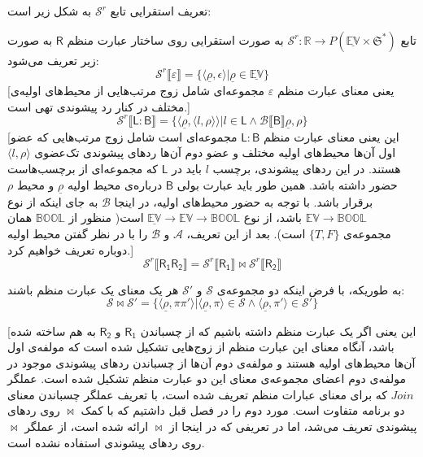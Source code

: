 تعریف استقرایی تابع 
$\mathcal{S}^r$
به شکل زیر است:
\begin{defn}
	تابع 
	$\mathcal{S}^r:\mathbb{R}\rightarrow \mathit{P}(\mathbb{\underline{EV}\times \mathfrak{S}}^*)$
	به صورت استقرایی روی ساختار عبارت منظم $\mathsf{R}$ به صورت زیر تعریف می‌شود:
$$\mathcal{S}^r\llbracket\varepsilon\rrbracket= \{ \langle \underline{\rho} , \epsilon \rangle | \underline{\rho} \in \underline{\mathbb{EV}}\}$$
[یعنی معنای عبارت منظم
$\varepsilon$
مجموعه‌ای شامل زوج مرتب‌هایی از محیط‌های اولیه‌ی مختلف در کنار رد پیشوندی تهی است.]
$$\mathcal{S}^r\llbracket\mathsf{L:B}\rrbracket = \{\langle\underline{\rho},\langle l , \rho \rangle \rangle | l \in \mathsf{L} \land \mathcal{B}\llbracket\mathsf{B}\rrbracket \underline{\rho},\rho \}$$
[این یعنی معنای عبارت منظم
$\mathsf{L:B}$
مجموعه‌ای است شامل زوج مرتب‌هایی که عضو اول آن‌ها محیط‌های اولیه مختلف و عضو دوم آن‌ها ردهای پیشوندی تک‌عضوی 
$\langle l , \rho \rangle$
هستند. در این ردهای پیشوندی، برچسب 
$l$
باید در
$\mathsf{L}$
که مجموعه‌ای از برچسب‌هاست حضور داشته باشد. همین طور باید عبارت بولی 
$\mathsf{B}$
درباره‌ی محیط اولیه
$\underline{\rho}$
و محیط 
$\rho$
برقرار باشد. با توجه به حضور محیط‌های اولیه، در اینجا
$\mathcal{B}$
به جای اینکه از نوع 
$\mathbb{EV} \rightarrow \mathbb{BOOL}$
باشد، از نوع
$\underline{\mathbb{EV}} \rightarrow \mathbb{EV} \rightarrow \mathbb{BOOL}$
است( منظور از 
$\mathbb{BOOL}$
همان مجموعه‌ی 
$\{\mathit{T,F}\}$
است). بعد از این تعریف،
$\mathcal{A}$
و 
$\mathcal{B}$
را با در نظر گفتن محیط اولیه دوباره تعریف خواهیم کرد.]
$$\mathcal{S}^r\llbracket\mathsf{R_1 R_2}\rrbracket= \mathcal{S}^r\llbracket\mathsf{R_1}\rrbracket \Join \mathcal{S}^r\llbracket\mathsf{R_2}\rrbracket$$
\begin{center}
	به ‌طوریکه، با فرض اینکه دو مجموعه‌ی 
	$\mathcal{S}$
	و
	$\mathcal{S'}$
	هر یک معنای یک عبارت منظم باشند:
$$\mathcal{S \Join S'}=
\{
\langle \underline{\rho}, \pi \pi' \rangle |
\langle \underline{\rho},\pi \rangle \in \mathcal{S} \land
\langle \underline{\rho},\pi' \rangle \in \mathcal{S'}
\}
$$
\end{center}
[این یعنی اگر یک عبارت منظم داشته باشیم که از چسباندن 
$\mathsf{R_1}$
و 
$\mathsf{R_2}$
به هم ساخته شده باشد، آنگاه معنای این عبارت منظم از زوج‌هایی تشکیل شده است که مولفه‌ی اول آن‌ها محیط‌های اولیه هستند و مولفه‌ی دوم آن‌ها از چسباندن ردهای پیشوندی موجود در مولفه‌ی دوم اعضای مجموعه‌ی معنای این دو عبارت منظم تشکیل شده است. عملگر $Join$ که برای معنای عبارات منظم تعریف شده است، با تعریف عملگر چسباندن معنای دو برنامه متفاوت است. مورد دوم را در فصل قبل داشتیم که با کمک $\Join$ روی ردهای پیشوندی تعریف می‌شد، اما در تعریفی که در اینجا از $\Join$ ارائه شده است، از عملگر $\Join$ روی ردهای پیشوندی استفاده نشده است.


\end{defn}

